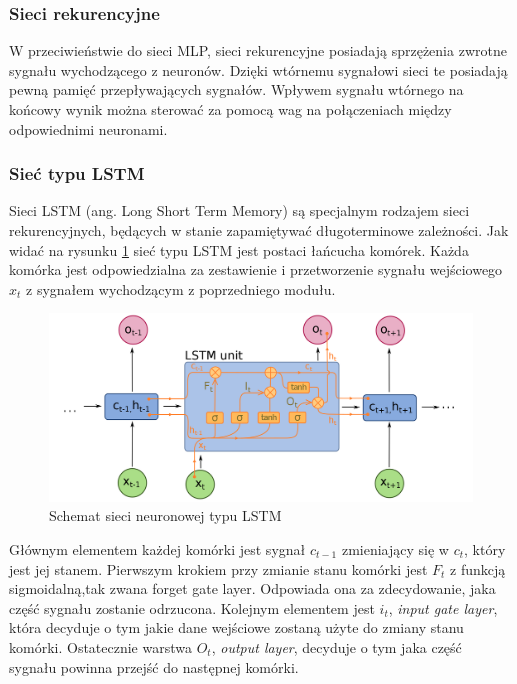 \documentclass[a4paper, twoside, 11pt, openright]{article}
\begin{document}
\subsubsection{Sieci rekurencyjne}

W przeciwieństwie do sieci MLP, sieci rekurencyjne posiadają sprzężenia zwrotne sygnału wychodzącego z neuronów. Dzięki wtórnemu sygnałowi sieci te posiadają pewną pamięć przepływających sygnałów. Wpływem sygnału wtórnego na końcowy wynik można sterować za pomocą wag na połączeniach między odpowiednimi neuronami.

\subsubsection{Sieć typu LSTM \cite{lstm}}

Sieci LSTM (ang. Long Short Term Memory) są specjalnym rodzajem sieci rekurencyjnych, będących w stanie zapamiętywać długoterminowe zależności. Jak widać na rysunku \ref{lstm-net} sieć typu LSTM jest postaci łańcucha komórek. Każda komórka jest odpowiedzialna za zestawienie i przetworzenie sygnału wejściowego $x_t$ z sygnałem wychodzącym z poprzedniego modułu.

\begin{figure}[H]
\centering \includegraphics[scale=0.22]{img/lstm.png}
\caption{Schemat sieci neuronowej typu LSTM \cite{lstm-scheme}}
\label{lstm-net}
\end{figure}

Głównym elementem każdej komórki jest sygnał $c_{t-1}$ zmieniający się w $c_{t}$, który jest jej stanem. Pierwszym krokiem przy zmianie stanu komórki jest $F_t$ z funkcją sigmoidalną,tak zwana forget gate layer.  Odpowiada ona za zdecydowanie, jaka część sygnału zostanie odrzucona. Kolejnym elementem jest $i_t$, \textit{input gate layer}, która decyduje o tym jakie dane wejściowe zostaną użyte do zmiany stanu komórki. Ostatecznie warstwa $O_t$, \textit{output layer}, decyduje o tym jaka część sygnału powinna przejść do następnej komórki.
\end{document}
